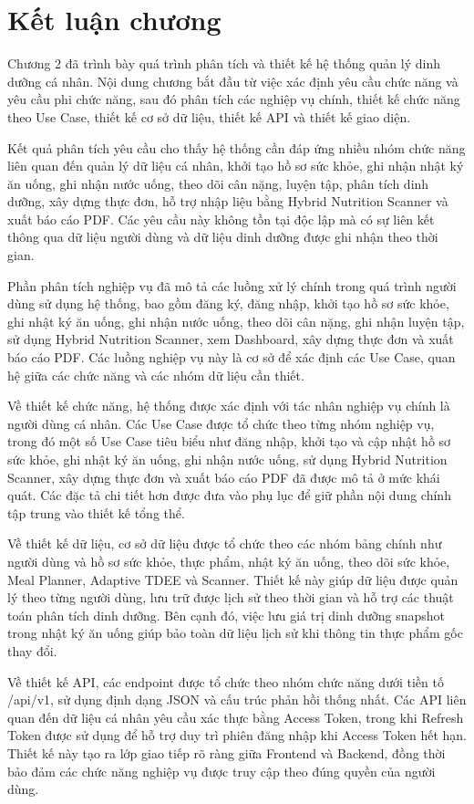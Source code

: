 \documentclass[12pt, a4paper]{report}
\begin{document}
\section{Kết luận chương}Chương 2 đã trình bày quá trình phân tích và thiết kế hệ thống quản lý dinh dưỡng cá nhân. Nội dung chương bắt đầu từ việc xác định yêu cầu chức năng và yêu cầu phi chức năng, sau đó phân tích các nghiệp vụ chính, thiết kế chức năng theo Use Case, thiết kế cơ sở dữ liệu, thiết kế API và thiết kế giao diện.

Kết quả phân tích yêu cầu cho thấy hệ thống cần đáp ứng nhiều nhóm chức năng liên quan đến quản lý dữ liệu cá nhân, khởi tạo hồ sơ sức khỏe, ghi nhận nhật ký ăn uống, ghi nhận nước uống, theo dõi cân nặng, luyện tập, phân tích dinh dưỡng, xây dựng thực đơn, hỗ trợ nhập liệu bằng Hybrid Nutrition Scanner và xuất báo cáo PDF. Các yêu cầu này không tồn tại độc lập mà có sự liên kết thông qua dữ liệu người dùng và dữ liệu dinh dưỡng được ghi nhận theo thời gian.

Phần phân tích nghiệp vụ đã mô tả các luồng xử lý chính trong quá trình người dùng sử dụng hệ thống, bao gồm đăng ký, đăng nhập, khởi tạo hồ sơ sức khỏe, ghi nhật ký ăn uống, ghi nhận nước uống, theo dõi cân nặng, ghi nhận luyện tập, sử dụng Hybrid Nutrition Scanner, xem Dashboard, xây dựng thực đơn và xuất báo cáo PDF. Các luồng nghiệp vụ này là cơ sở để xác định các Use Case, quan hệ giữa các chức năng và các nhóm dữ liệu cần thiết.

Về thiết kế chức năng, hệ thống được xác định với tác nhân nghiệp vụ chính là người dùng cá nhân. Các Use Case được tổ chức theo từng nhóm nghiệp vụ, trong đó một số Use Case tiêu biểu như đăng nhập, khởi tạo và cập nhật hồ sơ sức khỏe, ghi nhật ký ăn uống, ghi nhận nước uống, sử dụng Hybrid Nutrition Scanner, xây dựng thực đơn và xuất báo cáo PDF đã được mô tả ở mức khái quát. Các đặc tả chi tiết hơn được đưa vào phụ lục để giữ phần nội dung chính tập trung vào thiết kế tổng thể.

Về thiết kế dữ liệu, cơ sở dữ liệu được tổ chức theo các nhóm bảng chính như người dùng và hồ sơ sức khỏe, thực phẩm, nhật ký ăn uống, theo dõi sức khỏe, Meal Planner, Adaptive TDEE và Scanner. Thiết kế này giúp dữ liệu được quản lý theo từng người dùng, lưu trữ được lịch sử theo thời gian và hỗ trợ các thuật toán phân tích dinh dưỡng. Bên cạnh đó, việc lưu giá trị dinh dưỡng snapshot trong nhật ký ăn uống giúp bảo toàn dữ liệu lịch sử khi thông tin thực phẩm gốc thay đổi.

Về thiết kế API, các endpoint được tổ chức theo nhóm chức năng dưới tiền tố /api/v1, sử dụng định dạng JSON và cấu trúc phản hồi thống nhất. Các API liên quan đến dữ liệu cá nhân yêu cầu xác thực bằng Access Token, trong khi Refresh Token được sử dụng để hỗ trợ duy trì phiên đăng nhập khi Access Token hết hạn. Thiết kế này tạo ra lớp giao tiếp rõ ràng giữa Frontend và Backend, đồng thời bảo đảm các chức năng nghiệp vụ được truy cập theo đúng quyền của người dùng.
\end{document}
